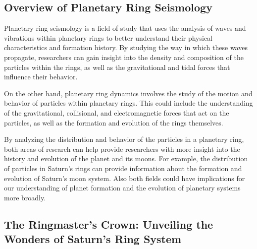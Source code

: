 \documentclass{article}
\begin{document}





\subsection{Overview of Planetary Ring Seismology}

Planetary ring seismology is a field of study that uses the analysis of waves and vibrations within planetary rings to better understand their physical characteristics and formation history. By studying the way in which these waves propagate, researchers can gain insight into the density and composition of the particles within the rings, as well as the gravitational and tidal forces that influence their behavior.

On the other hand, planetary ring dynamics involves the study of the motion and behavior of particles within planetary rings. This could include the understanding of the gravitational, collisional, and electromagnetic forces that act on the particles, as well as the formation and evolution of the rings themselves.

By analyzing the distribution and behavior of the particles in a planetary ring, both areas of research can help provide researchers with more insight into the history and evolution of the planet and its moons. For example, the distribution of particles in Saturn's rings can provide information about the formation and evolution of Saturn's moon system. Also both fields could have implications for our understanding of planet formation and the evolution of planetary systems more broadly.


\subsection{The Ringmaster's Crown: Unveiling the Wonders of Saturn's Ring System}
\end{document}
